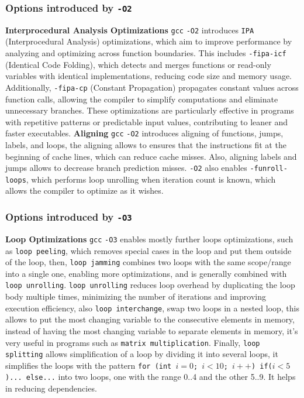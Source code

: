 \documentclass{rapport}
\newcommand{\gcc}{\texttt{gcc} }
\newcommand{\optitwo}{\texttt{-O2} }
\newcommand{\optithree}{\texttt{-O3} }
\begin{document}
\subsubsection{Options introduced by \optitwo}
\textbf{Interprocedural Analysis Optimizations} \newline
\gcc \optitwo introduces \texttt{IPA} (Interprocedural Analysis) optimizations, which aim to improve performance by analyzing and optimizing across function boundaries. 
This includes \texttt{-fipa-icf} (Identical Code Folding), which detects and merges functions or read-only variables with identical implementations, reducing code size and memory usage. 
\newline
Additionally, \texttt{-fipa-cp} (Constant Propagation) propagates constant values across function calls, allowing the compiler to simplify computations and eliminate unnecessary branches. 
These optimizations are particularly effective in programs with repetitive patterns or predictable input values, contributing to leaner and faster executables.
\newline
\newline
\textbf{Aligning}\newline
\gcc \optitwo introduces aligning of functions, jumps, labels, and loops, the aligning allows to ensures that the instructions fit at the beginning of cache lines, which can reduce 
cache misses. Also, aligning labels and jumps allows to decrease branch prediction misses.
\newline\newline
\optitwo also enables \texttt{-funroll-loops}, which performs loop unrolling when iteration count is known, which allows the compiler to optimize as it wishes.


\subsubsection{Options introduced by \optithree}
\textbf{Loop Optimizations} \newline
\gcc \optithree enables mostly further loops optimizations, such as \texttt{loop peeling}, which removes special cases in the loop and put them outside of the 
loop, then, \texttt{loop jamming} combines two loops with the same scope/range into a single one, enabling more optimizations, and is generally combined with \texttt{loop unrolling}.
\newline
\texttt{loop unrolling} reduces loop overhead by duplicating the loop body multiple times, minimizing the number of iterations and improving execution efficiency, also 
\texttt{loop interchange}, swap two loops in a nested loop, this allows to put the most changing variable to the consecutive elements in memory, instead of having the most 
changing variable to separate elements in memory, it's very useful in programs such as \texttt{matrix multiplication}. 
\newline
Finally, \texttt{loop splitting} allows simplification of a loop 
by dividing it into several loops, it simplifies the loops with the pattern \texttt{for (int $i=0$; $i<10$; $i++$) if($i<5$)... else...} into two loops, one with the range 0..4 and 
the other 5..9. It helps in reducing dependencies.
\end{document}
